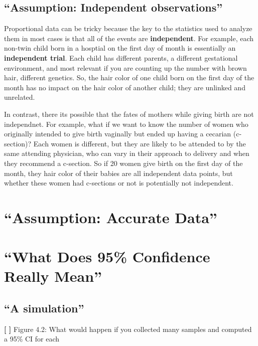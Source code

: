 \documentclass[]{book}
\theoremstyle{definition}
\theoremstyle{definition}
\theoremstyle{definition}
\theoremstyle{remark}
\begin{document}
\subsection{\texorpdfstring{``Assumption: Independent
observations''}{Assumption: Independent observations}}\label{assumption-independent-observations}

Proportional data can be tricky because the key to the statistics used
to analyze them in most cases is that all of the events are
\textbf{independent}. For example, each non-twin child born in a
hosptial on the first day of month is essentially an \textbf{independent
trial}. Each child has different parents, a different gestational
environment, and most relevant if you are counting up the number with
brown hair, different genetics. So, the hair color of one child born on
the first day of the month has no impact on the hair color of another
child; they are unlinked and unrelated.

In contrast, there its possible that the fates of mothers while giving
birth are not independnet. For example, what if we want to know the
number of women who originally intended to give birth vaginally but
ended up having a cecarian (c-section)? Each women is different, but
they are likely to be attended to by the same attending physician, who
can vary in their approach to delivery and when they recommend a
c-section. So if 20 women give birth on the first day of the month, they
hair color of their babies are all independent data points, but whether
these women had c-sections or not is potentially not independent.

\section{\texorpdfstring{``Assumption: Accurate
Data''}{Assumption: Accurate Data}}\label{assumption-accurate-data}

\section{\texorpdfstring{``What Does 95\% Confidence Really
Mean''}{What Does 95\% Confidence Really Mean}}\label{what-does-95-confidence-really-mean}

\subsection{\texorpdfstring{``A
simulation''}{A simulation}}\label{a-simulation}

\textbf{{[} {]}} Figure 4.2: What would happen if you collected many
samples and computed a 95\% CI for each
\end{document}
